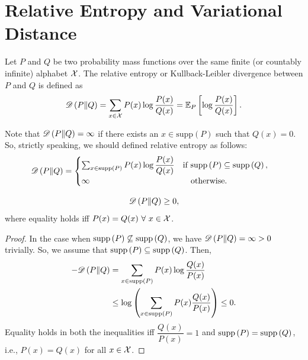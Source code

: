 \documentclass[11pt,a4paper]{article}
\begin{document}
\begin{theorem}
    
\end{theorem}

\section{Relative Entropy and Variational Distance}

\begin{definition}
    Let $P$ and $Q$ be two probability mass functions over the same finite (or countably infinite) alphabet $\mathcal{X}$. The relative entropy or Kullback-Leibler divergence between $P$ and $Q$ is defined as 
    \begin{equation*}
        \mathscr{D} \left(P\|Q\right) = \sum_{x\in\mathcal{X}} P(x) \log \dfrac{P(x)}{Q(x)} = \mathbb{E}_P\left[ \log \dfrac{P(x)}{Q(x)} \right].
    \end{equation*}
\end{definition}

\begin{remark}
    Note that $\mathscr{D} \left(P\|Q\right) = \infty$ if there exists an $x\in \text{supp}(P)$ such that $Q(x) = 0$. So, strictly speaking, we should defined relative entropy as follows:
    \begin{equation*}
        \divergence{P}{Q} = \begin{cases}
            \sum_{x\in\supp{P}} P(x) \log \dfrac{P(x)}{Q(x)} \quad\text{if }\supp{P} \subseteq \supp{Q}, \\
            \infty \hspace{4.3cm} \text{otherwise}.
        \end{cases}
    \end{equation*}
\end{remark}

\begin{theorem}
    \begin{equation*}
        \mathscr{D} \left(P\|Q\right) \ge 0,
    \end{equation*}
    where equality holds iff $P(x) = Q(x)\ \forall\ x\in \mathcal{X}$.
\end{theorem}

\begin{proof}
    In the case when $\text{supp}\left( P \right)\not\subseteq \text{supp}\left( Q \right)$, we have $\mathscr{D} \left(P\|Q\right) = \infty > 0$ trivially. So, we assume that $\text{supp}\left( P \right)\subseteq \text{supp}\left( Q \right)$. Then, 
    \begin{align*}
        -\mathscr{D} \left(P\|Q\right) &= \sum_{x\in\text{supp}\left( P \right)} P(x) \log \dfrac{Q(x)}{P(x)} \\
        &\le \log \left(\sum_{x\in\text{supp}\left( P \right)} P(x) \dfrac{Q(x)}{P(x)}\right) \le 0.
    \end{align*}
    Equality holds in both the inequalities iff $\dfrac{Q(x)}{P(x)} = 1$ and $\text{supp}\left( P \right) = \text{supp}\left( Q \right)$, i.e., $P(x) = Q(x)$ for all $x\in\mathcal{X}$.
\end{proof}
\end{document}
